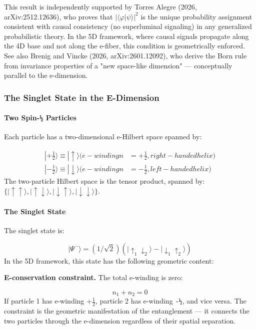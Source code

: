 \documentclass[aps,prd,preprint,superscriptaddress,longbibliography,floatfix]{revtex4-2}
\theoremstyle{remark}
\begin{document}
This result is independently supported by Torres Alegre (2026, arXiv:2512.12636), who proves that $|\langle\varphi|\psi\rangle|^{2}$ is the unique probability assignment consistent with causal consistency (no superluminal signaling) in any generalized probabilistic theory. In the 5D framework, where causal signals propagate along the 4D base and not along the e-fiber, this condition is geometrically enforced. See also Brenig and Vincke (2026, arXiv:2601.12092), who derive the Born rule from invariance properties of a "new space-like dimension" --- conceptually parallel to the e-dimension.


\subsubsection{The Singlet State in the E-Dimension}


\paragraph{Two Spin-\texttt{½} Particles}

Each particle has a two-dimensional e-Hilbert space spanned by:


\begin{align}
    |+\tfrac{1}{2}\rangle \equiv |\uparrow\rangle    (e-winding n &= +\tfrac{1}{2}, right-handed helix) \\
    |-\tfrac{1}{2}\rangle \equiv |\downarrow\rangle    (e-winding n &= -\tfrac{1}{2}, left-handed helix)
\end{align}
The two-particle Hilbert space is the tensor product, spanned by: $\{|\uparrow\uparrow\rangle, |\uparrow\downarrow\rangle, |\downarrow\uparrow\rangle, |\downarrow\downarrow\rangle\}$.


\paragraph{The Singlet State}

The singlet state is:


\begin{equation}
    |\Psi^{-}\rangle = (1/\sqrt{2})(|\uparrow_{1}\downarrow_{2}\rangle - |\downarrow_{1}\uparrow_{2}\rangle)
\end{equation}
In the 5D framework, this state has the following geometric content:

\textbf{E-conservation constraint.} The total e-winding is zero:


\begin{equation}
    n_{1} + n_{2} = 0
\end{equation}
If particle 1 has e-winding $+\tfrac{1}{2}$, particle 2 has e-winding \texttt{-½}, and vice versa. The constraint is the geometric manifestation of the entanglement --- it connects the two particles through the e-dimension regardless of their spatial separation.
\end{document}
